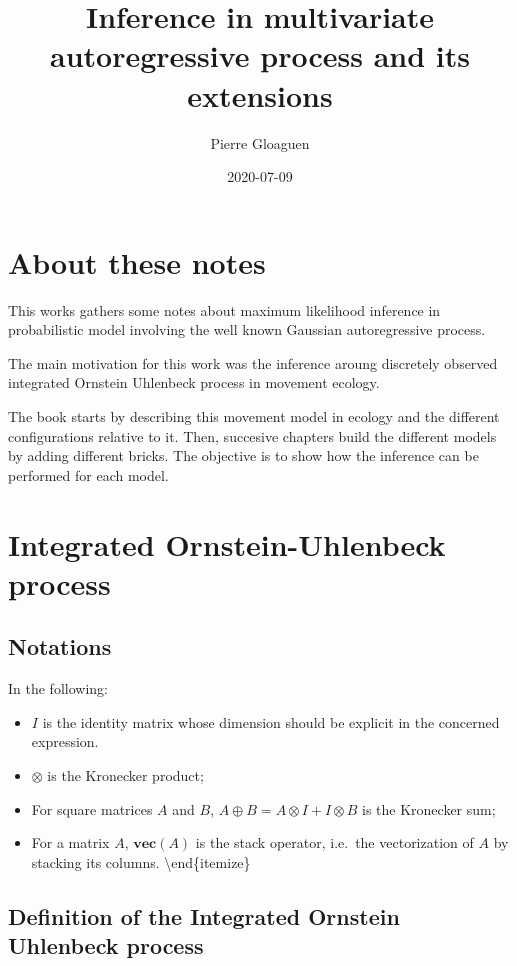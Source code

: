 \documentclass[]{book}
\title{Inference in multivariate autoregressive process and its extensions}
\author{Pierre Gloaguen}
\date{2020-07-09}
\providecommand{\tightlist}{%
  \setlength{\itemsep}{0pt}\setlength{\parskip}{0pt}}
\newcommand{\Vect}[1]{\textbf{vec}\left(#1 \right)}
\begin{document}
\maketitle

{
\setcounter{tocdepth}{1}
\tableofcontents
}
\chapter*{About these notes}\label{about-these-notes}

This works gathers some notes about maximum likelihood inference in
probabilistic model involving the well known Gaussian autoregressive
process.

The main motivation for this work was the inference aroung discretely
observed integrated Ornstein Uhlenbeck process in movement ecology.

The book starts by describing this movement model in ecology and the
different configurations relative to it. Then, succesive chapters build
the different models by adding different bricks. The objective is to
show how the inference can be performed for each model.

\chapter{Integrated Ornstein-Uhlenbeck
process}\label{integrated-ornstein-uhlenbeck-process}

\section{Notations}\label{notations}

In the following:

\begin{itemize}
\tightlist
\item
  \(I\) is the identity matrix whose dimension should be explicit in the
  concerned expression.
\item
  \(\otimes\) is the Kronecker product;
\item
  For square matrices \(A\) and \(B\),
  \(A \oplus B = A\otimes I + I \otimes B\) is the Kronecker sum;
\item
  For a matrix \(A\), \(\Vect A\) is the stack operator, i.e.~the
  vectorization of \(A\) by stacking its columns.
  \textbackslash{}end\{itemize\}
\end{itemize}

\section{Definition of the Integrated Ornstein Uhlenbeck
process}\label{definition-of-the-integrated-ornstein-uhlenbeck-process}
\end{document}

